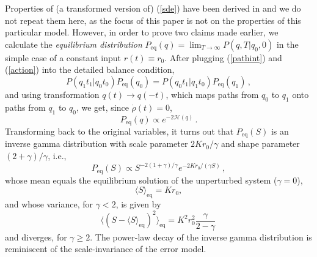 \documentclass[12pt,a4paper,final]{iopart}
\newcommand{\eq}{\mbox{eq}}
\begin{document}
Properties of (a transformed version of) (\ref{sde}) have been derived in \cite{dutre_1977_SDE, fujisaka_1986_intermittency} and we do not repeat them here, as the focus of this paper is not on the properties of this particular model. However, in order to prove two claims made earlier, we calculate the {\em equilibrium distribution} $P_{\eq}(q) = \lim_{T\rightarrow\infty} P(q,T|q_0,0)$ in the simple case of a constant input $r(t)\equiv r_{0}$. After plugging (\ref{pathint}) and (\ref{action}) into the detailed balance condition,
\begin{equation}\label{detailed_balance}
P(q_1 t_1 | q_0 t_0 ) P_{\eq}(q_0) = P(q_0 t_1 | q_1 t_0 ) P_{\eq}(q_1) \,,
\end{equation}
and using transformation $q(t) \rightarrow q(-t)$, which maps paths from $q_0$ to $q_1$ onto paths from $q_1$ to $q_0$, we get, since $\dot\rho(t)= 0$,
\begin{equation}\label{Peq}
  P_{\eq}(q)
  \propto
  e^{-2\mathcal{H}(q)}\,.
\end{equation}
Transforming back to the original variables, it turns out that $P_{\eq}(S)$ is an inverse gamma distribution with scale parameter $2Kr_{0}/\gamma$ and shape parameter $(2+\gamma)/\gamma$, i.e.,
\begin{equation}\label{inverse_gamma}
  P_{\eq}(S)
  \propto
  S^{-2(1+\gamma)/\gamma}e^{-2Kr_{0}/(\gamma S)}\,,
\end{equation}
whose mean equals the equilibrium solution of the unperturbed system ($\gamma=0$),
\begin{equation}\label{equilibrium_mean}
  \langle S\rangle_{\eq}=Kr_{0},
\end{equation}
and whose variance, for $\gamma< 2$, is given by
\begin{equation}
  \langle (S - \langle S\rangle_{\eq})^2\rangle_{\eq}
  =
  K^2r_{0}^2
  \frac{\gamma}{2-\gamma}\,
\end{equation}
and diverges, for $\gamma\geq 2$.
The power-law decay of the inverse gamma distribution is reminiscent of the scale-invariance of the error model.
\end{document}
